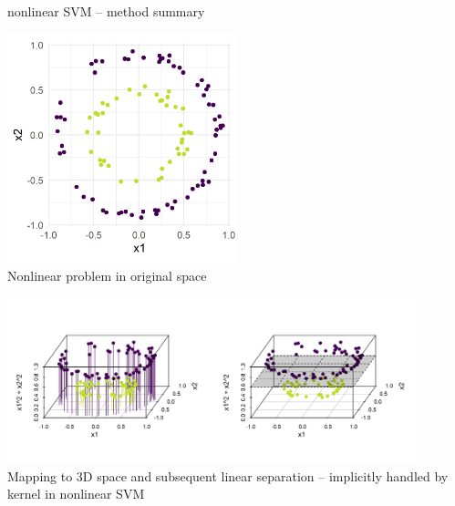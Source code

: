 \begin{frame}{nonlinear SVM -- method summary}
\begin{minipage}[b]{0.33\textwidth}
  \centering
  \includegraphics[width=0.5\textwidth]{
  ../slides/nonlinear-svm/figure/circles_ds.png} \\
  \tiny{Nonlinear problem in original space} 
\end{minipage}
\begin{minipage}[b]{0.66\textwidth}
  \centering
  \includegraphics[width=0.9\textwidth, trim=0 30 0 0, clip]{
  ../slides/nonlinear-svm/figure/circles_feature_map.png} \\
  \tiny{Mapping to 3D space and subsequent linear separation -- implicitly 
  handled by kernel in nonlinear SVM}
\end{minipage}

\end{frame}



